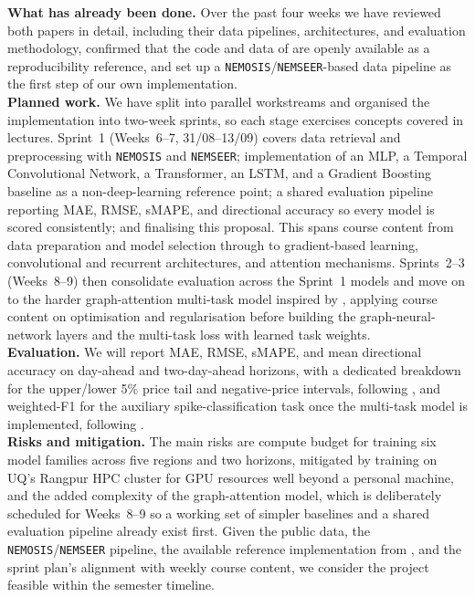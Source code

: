 \documentclass[a4paper,11pt]{article} %
\begin{document}
\textbf{What has already been done.} Over the past four weeks we have reviewed both
papers in detail, including their data pipelines, architectures, and evaluation
methodology, confirmed that the code and data of \citet{gani2026deeptime} are openly
available as a reproducibility reference, and set up a
\texttt{NEMOSIS}/\texttt{NEMSEER}-based data pipeline as the first step of our own
implementation. \\

\textbf{Planned work.} We have split into parallel workstreams and organised the
implementation into two-week sprints, so each stage exercises concepts covered in
lectures. Sprint~1 (Weeks~6--7, 31/08--13/09) covers data retrieval and preprocessing
with \texttt{NEMOSIS} and \texttt{NEMSEER}; implementation of an MLP, a Temporal
Convolutional Network, a Transformer, an LSTM, and a Gradient Boosting baseline as a
non-deep-learning reference point; a shared evaluation pipeline reporting MAE, RMSE,
sMAPE, and directional accuracy so every model is scored consistently; and finalising
this proposal. This spans course content from data preparation and model selection
through to gradient-based learning, convolutional and recurrent architectures, and
attention mechanisms. Sprints~2--3 (Weeks~8--9) then consolidate evaluation across the
Sprint~1 models and move on to the harder graph-attention multi-task model inspired by
\citet{li2025mgaal}, applying course content on optimisation and regularisation before
building the graph-neural-network layers and the multi-task loss with learned task
weights. \\

\textbf{Evaluation.} We will report MAE, RMSE, sMAPE, and mean directional accuracy on
day-ahead and two-day-ahead horizons, with a dedicated breakdown for the upper/lower 5\%
price tail and negative-price intervals, following \citet{gani2026deeptime}, and
weighted-F1 for the auxiliary spike-classification task once the multi-task model is
implemented, following \citet{li2025mgaal}.\\
\textbf{Risks and mitigation.} The main risks are compute budget for training six model
families across five regions and two horizons, mitigated by training on UQ's Rangpur HPC
cluster for GPU resources well beyond a personal machine, and the added complexity of
the graph-attention model, which is deliberately scheduled for Weeks~8--9 so a working
set of simpler baselines and a shared evaluation pipeline already exist first. Given the
public data, the \texttt{NEMOSIS}/\texttt{NEMSEER} pipeline, the available reference
implementation from \citet{gani2026deeptime}, and the sprint plan's alignment with weekly
course content, we consider the project feasible within the semester timeline.

\smaller
\printbibliography
\end{document}
